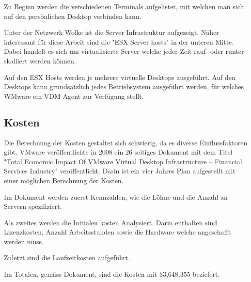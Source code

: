 
Zu Beginn werden die verschiedenen Terminals aufgelistet, mit welchen man sich auf den persönlichen Desktop verbinden kann. 

Unter der Netzwerk Wolke ist die Server Infrastruktur aufgezeigt.
Näher interessant für diese Arbeit sind die "ESX Server hosts" in der unteren Mitte. Dabei handelt es sich um virtualisierte Server welche jeder Zeit rauf- oder runter-skalliert werden können. 

Auf den ESX Hosts werden je mehrere virtuelle Desktops ausgeführt. 
Auf den Desktops kann grundsätzlich jedes Betriebsystem ausgeführt werden, für welches WMware ein VDM Agent zur Verfügung stellt.



\subsection{Kosten}
Die Berechnung der Kosten gestaltet sich schwierig, da es diverse Einflussfaktoren gibt.
VMware veröffentlichte in 2008 ein 26 seitiges Dokument mit dem Titel "Total Economic Impact Of VMware Virtual Desktop Infrastructure – Financial Services Industry" %
veröffentlicht. Darin ist ein vier Jahres Plan aufgestellt mit einer möglichen Berechnung der Kosten.

Im Dokument werden zuerst Kennzahlen, wie die Löhne und die Anzahl an Servern spezifiziert.

Als zweites werden die Initialen kosten Analysiert. Darin enthalten sind Lizenzkosten, Anzahl Arbeitsstunden sowie die Hardware welche angeschafft werden muss.

Zuletzt sind die Laufzeitkosten aufgeführt.

Im Totalen, gemäss Dokument, sind die Kosten mit \$3,648,355 beziefert. 

